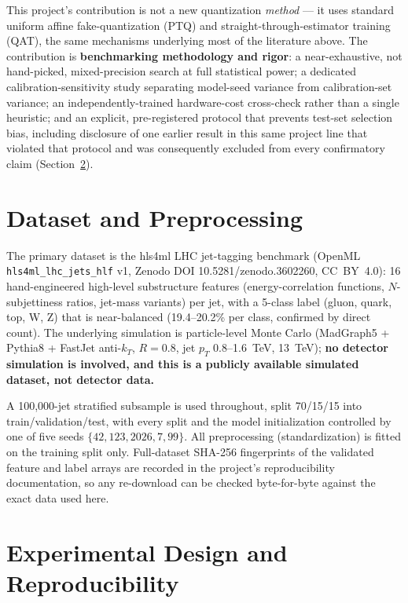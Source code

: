 \documentclass[11pt]{article}
\begin{document}
This project's contribution is not a new quantization \emph{method} --- it uses standard uniform affine
fake-quantization (PTQ) and straight-through-estimator training (QAT), the same mechanisms underlying
most of the literature above. The contribution is \textbf{benchmarking methodology and rigor}: a
near-exhaustive, not hand-picked, mixed-precision search at full statistical power; a dedicated
calibration-sensitivity study separating model-seed variance from calibration-set variance; an
independently-trained hardware-cost cross-check rather than a single heuristic; and an explicit,
pre-registered protocol that prevents test-set selection bias, including disclosure of one earlier
result in this same project line that violated that protocol and was consequently excluded from every
confirmatory claim (Section~\ref{sec:design}).

\section{Dataset and Preprocessing}
\label{sec:data}

The primary dataset is the hls4ml LHC jet-tagging benchmark \citep{duarte2018fast} (OpenML
\texttt{hls4ml\_lhc\_jets\_hlf} v1, Zenodo DOI 10.5281/zenodo.3602260, CC~BY~4.0): 16 hand-engineered
high-level substructure features (energy-correlation functions, $N$-subjettiness ratios, jet-mass
variants) per jet, with a 5-class label (gluon, quark, top, W, Z) that is near-balanced (19.4--20.2\%
per class, confirmed by direct count). The underlying simulation is particle-level Monte Carlo
(MadGraph5 + Pythia8 + FastJet anti-$k_T$, $R=0.8$, jet $p_T$ 0.8--1.6~TeV, 13~TeV); \textbf{no detector
simulation is involved, and this is a publicly available simulated dataset, not detector data.}

A 100{,}000-jet stratified subsample is used throughout, split 70/15/15 into train/validation/test,
with every split and the model initialization controlled by one of five seeds
$\{42, 123, 2026, 7, 99\}$. All preprocessing (standardization) is fitted on the training split only.
Full-dataset SHA-256 fingerprints of the validated feature and label arrays are recorded in the
project's reproducibility documentation, so any re-download can be checked byte-for-byte against the
exact data used here.

\section{Experimental Design and Reproducibility}
\label{sec:design}
\end{document}
